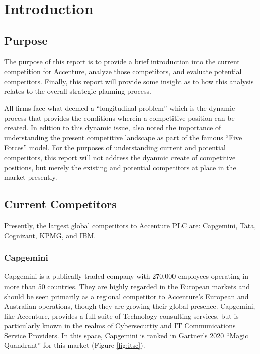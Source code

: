 \section{Introduction}

\subsection{Purpose}

The purpose of this report is to provide a brief introduction into the current competition for Accenture, analyze those competitors, and evaluate potential competitors. Finally, this report will provide some insight as to how this analysis relates to the overall strategic planning process.

All firms face what \textcite{porterDynamicTheoryStrategy1991} deemed a ``longitudinal problem'' which is the dynamic process that provides the conditions wherein a competitive position can be created. In edition to this dynamic issue, \textcite{Porter1979} also noted the importance of understanding the present competitive landscape as part of the famous ``Five Forces'' model. For the purposes of understanding current and potential competitors, this report will not address the dyanmic create of competitive positions, but merely the existing and potential competitors at place in the market presently.

\subsection{Current Competitors}

Presently, the largest global competitors to Accenture PLC are: Capgemini, Tata, Cognizant, KPMG, and IBM.

\subsubsection{Capgemini}

Capgemini is a publically traded company with 270,000 employees operating in more than 50 countries. They are highly regarded in the European markets and should be seen primarily as a regional competitor to Accenture's European and Australian operations, though they are growing their global presence. Capgemini, like Accenture, provides a full suite of Technology consulting services, but is particularly known in the realms of Cybersecurtiy and IT Communications Service Providers. In this space, Capgemini is ranked in Gartner's 2020 ``Magic Quandrant'' for this market (Figure \ref{fig:itsc}).

